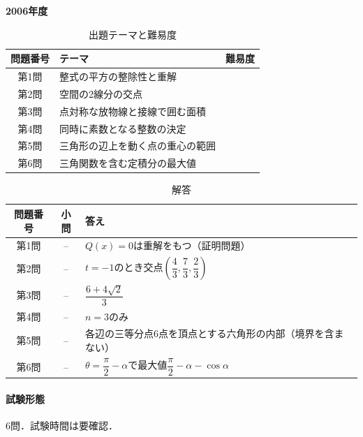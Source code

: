 \documentclass[../../main.tex]{subfiles}
\begin{document}
\begin{center}
  {\fontsize{48pt}{58pt}\selectfont \textbf{2006}\normalsize\textbf{年度}}
\end{center}

\begin{table}[htb]
  \centering
  \caption{出題テーマと難易度}
  \begin{tabular}{|c|p{9cm}|c|}
    \hline
    \textbf{問題番号} & \textbf{テーマ} & \textbf{難易度} \\
    \hline
    第1問 & 整式の平方の整除性と重解 & \\
    \hline
    第2問 & 空間の2線分の交点 & \\
    \hline
    第3問 & 点対称な放物線と接線で囲む面積 & \\
    \hline
    第4問 & 同時に素数となる整数の決定 & \\
    \hline
    第5問 & 三角形の辺上を動く点の重心の範囲 & \\
    \hline
    第6問 & 三角関数を含む定積分の最大値 & \\
    \hline
  \end{tabular}
\end{table}

\begin{table}[htb]
  \centering
  \caption{解答}
  \renewcommand{\arraystretch}{1.4}
  \begin{tabular}{|c|c|p{9cm}|}
    \hline
    \textbf{問題番号} & \textbf{小問} & \textbf{答え} \\
    \hline
    第1問 & -- & $Q(x)=0$は重解をもつ（証明問題） \\
    \hline
    第2問 & -- & $t=-1$のとき交点$\left(\dfrac{4}{3},\dfrac{7}{3},\dfrac{2}{3}\right)$ \\
    \hline
    第3問 & -- & $\dfrac{6+4\sqrt{2}}{3}$ \\
    \hline
    第4問 & -- & $n=3$のみ \\
    \hline
    第5問 & -- & 各辺の三等分点6点を頂点とする六角形の内部（境界を含まない） \\
    \hline
    第6問 & -- & $\theta=\dfrac{\pi}{2}-\alpha$で最大値$\dfrac{\pi}{2}-\alpha-\cos\alpha$ \\
    \hline
  \end{tabular}
\end{table}

\paragraph{試験形態}
6問．試験時間は要確認．
\end{document}
